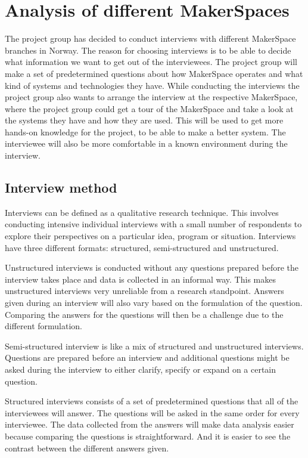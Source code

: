 \section{Analysis of different MakerSpaces}
The project group has decided to conduct interviews with different MakerSpace branches in Norway. The reason for choosing interviews is to be able to decide what information we want to get out of the interviewees. The project group will make a set of predetermined questions about how MakerSpace operates and what kind of systems and technologies they have. While conducting the interviews the project group also wants to arrange the interview at the respective MakerSpace, where the project group could get a tour of the MakerSpace and take a look at the systems they have and how they are used. This will be used to get more hands-on knowledge for the project, to be able to make a better system. The interviewee will also be more comfortable in a known environment during the interview. 

\subsection{Interview method}

Interviews can be defined as a qualitative research technique. This involves conducting intensive individual interviews with a small number of respondents to explore their perspectives on a particular idea, program or situation.\cite{Interview-Methods} Interviews have three different formats: structured, semi-structured and unstructured.

Unstructured interviews is conducted without any questions prepared before the interview takes place and data is collected in an informal way. This makes unstructured interviews very unreliable from a research standpoint. Answers given during an interview will also vary based on the formulation of the question. Comparing the answers for the questions will then be a challenge due to the different formulation.

Semi-structured interview is like a mix of structured and unstructured interviews. Questions are prepared before an interview and additional questions might be asked during the interview to either clarify, specify or expand on a certain question. 

Structured interviews consists of a set of predetermined questions that all of the interviewees will answer. The questions will be asked in the same order for every interviewee. The data collected from the answers will make data analysis easier because comparing the questions is straightforward. And it is easier to see the contrast between the different answers given.

